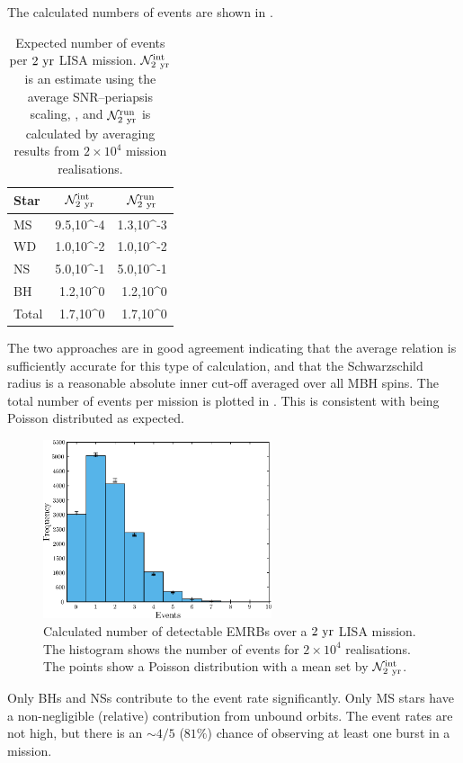 The calculated numbers of events are shown in . 
\begin{table}\footnotesize
\centering
  \begin{tabular}{l D{,}{\,\times\,}{3.4} D{,}{\,\times\,}{3.4}}
  \toprule
  Star &  &  \\ \midrule
  MS & 9.5,10^{-4} & 1.3,10^{-3} \\
  WD & 1.0,10^{-2} & 1.0,10^{-2} \\
  NS & 5.0,10^{-1} & 5.0,10^{-1}  \\
  BH & 1.2,10^{0} & 1.2,10^{0} \\
  \midrule
  Total & 1.7,10^{0} & 1.7,10^{0} \\
  \bottomrule
\end{tabular}
  \caption{Expected number of events per $2~\mathrm{yr}$ LISA mission. $\mathcal{N}_{2~\mathrm{yr}}^\mathrm{int}$ is an estimate using the average SNR--periapsis scaling, , and $\mathcal{N}_{2~\mathrm{yr}}^\mathrm{run}$ is calculated by averaging results from $2 \times 10^4$ mission realisations.}\label{tab:Rates}
\end{table}
The two approaches are in good agreement indicating that the average relation  is sufficiently accurate for this type of calculation, and that the Schwarzschild radius is a reasonable absolute inner cut-off averaged over all MBH spins. The total number of events per mission is plotted in . 
This is consistent with being Poisson distributed as expected.
\begin{figure}%
\centering
   \includegraphics[width=0.6\textwidth]{./images/Fig_Total_event_hist}
\caption{Calculated number of detectable EMRBs over a $2~\mathrm{yr}$ LISA mission. The histogram shows the number of events for $2 \times 10^4$ realisations. The points show a Poisson distribution with a mean set by $\mathcal{N}_{2~\mathrm{yr}}^\mathrm{int}$.}
\label{fig:Event-no}
\end{figure}
Only BHs and NSs contribute to the event rate significantly. Only MS stars have a non-negligible (relative) contribution from unbound orbits. The event rates are not high, but there is an $\sim 4/5$ ($81\%$) chance of observing at least one burst in a mission.

